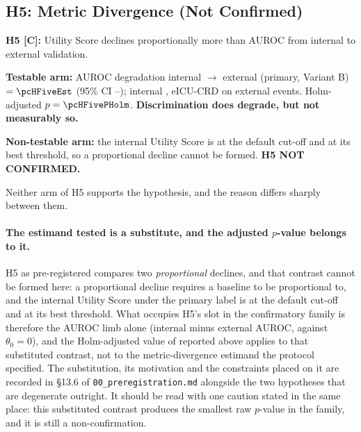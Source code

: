 \subsection{H5: Metric Divergence (Not Confirmed)}
\label{sec:h5}

\begin{mdframed}[backgroundcolor=ATUOrange!20, linecolor=ATUOrange]
    \textbf{H5 [C]:} Utility Score declines proportionally more than AUROC from
    internal to external validation.

    \textbf{Testable arm:} AUROC degradation internal $\to$ external (primary,
    Variant B) $= \pcHFiveEst$ (95\% CI \pcHFiveCiLo--\pcHFiveCiHi); internal
    \pcAurocPrimaryB, eICU-CRD \pcExtAurocPrimaryB{} on \pcExtNEventsB{}
    external events. Holm-adjusted $p = \pcHFivePHolm$.
    \textbf{Discrimination does degrade, but not measurably so.}

    \textbf{Non-testable arm:} the internal Utility Score is
    \pcUtilityPrimaryB{} at the default cut-off and \pcUtilityMaxPrimaryB{} at
    its best threshold, so a proportional decline cannot be formed.
    \textbf{H5 NOT CONFIRMED.}
\end{mdframed}

Neither arm of H5 supports the hypothesis, and the reason differs sharply
between them.

\paragraph{The estimand tested is a substitute, and the adjusted $p$-value
belongs to it.} H5 as pre-registered compares two \emph{proportional} declines,
and that contrast cannot be formed here: a proportional decline requires a
baseline to be proportional to, and the internal Utility Score under the primary
label is \pcUtilityPrimaryB{} at the default cut-off and \pcUtilityMaxPrimaryB{}
at its best threshold. What occupies H5's slot in the confirmatory family is
therefore the AUROC limb alone (internal minus external AUROC, against
$\theta_0 = 0$), and the Holm-adjusted value of \pcHFivePHolm{} reported above
applies to that substituted contrast, not to the metric-divergence estimand the
protocol specified. The substitution, its motivation and the constraints placed
on it are recorded in \S13.6 of \texttt{00\_preregistration.md} alongside the
two hypotheses that are degenerate outright. It should be read with one caution
stated in the same place: this substituted contrast produces the smallest raw
$p$-value in the family, and it is still a non-confirmation.

